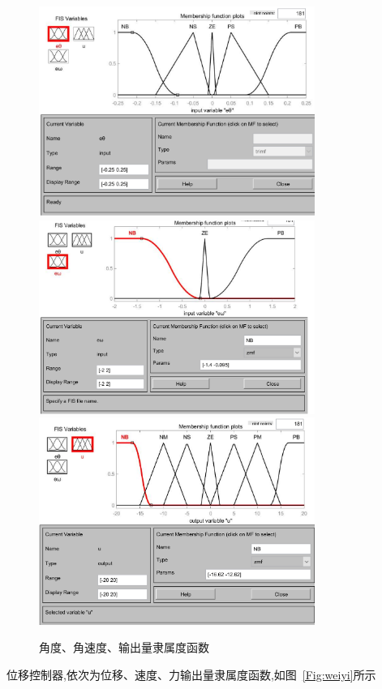 \begin{figure}[hbpt]
\centering
\includegraphics[width=9cm]{a1.png}
\includegraphics[width=9cm]{a2.png}
\includegraphics[width=9cm]{a3.png}
\caption{角度、角速度、输出量隶属度函数}\label{Fig:a}
\end{figure}

位移控制器,依次为位移、速度、力输出量隶属度函数,如图~\ref{Fig:weiyi}所示

